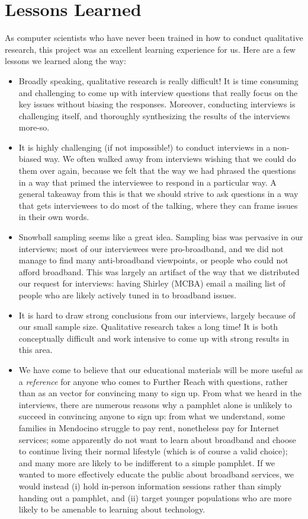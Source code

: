 \section{Lessons Learned}
\label{sec:lessons}

As computer scientists who have never been trained in how to conduct qualitative
research, this project was an excellent learning
experience for us. Here are a few lessons we learned along the way:

\begin{itemize}
\item Broadly speaking, qualitative research is really difficult! It is time
consuming and challenging to come up with interview questions that really
focus on the key issues without biasing the responses. Moreover, conducting
interviews is challenging itself, and thoroughly synthesizing the results of
the interviews more-so.
\item It is highly challenging (if not impossible!) to conduct interviews in a
non-biased way. We often walked away from interviews wishing that we could do
them over again, because we felt that the way we had phrased the questions in
a way that primed the interviewee to respond in a particular way. A general
takeaway from this is that we should strive to ask questions in a way that
gets interviewees to do most of the talking, where they can frame issues in
their own words.
\item Snowball sampling seems like a great idea. Sampling bias was pervasive in our interviews; most of our
interviewees were pro-broadband, and we did not manage to find many
anti-broadband viewpoints,
or people who could not afford broadband. This was largely an artifact of the
way that we distributed our request for interviews: having Shirley (MCBA)
email a mailing list of people who are likely actively tuned in to broadband issues.
\item It is hard to draw strong conclusions from our interviews, largely
because of our small sample size. Qualitative research takes a long time! It is
both conceptually difficult and work intensive to come up with strong results
in this area.
\item We have come to believe that our educational materials will be more
useful as a {\em reference} for anyone who comes to Further Reach with
questions, rather than as an vector for convincing many to sign up. From
what we heard in the interviews, there
are numerous reasons why a pamphlet alone is unlikely to succeed in convincing
anyone to sign up: from what we understand, some families in Mendocino
struggle to pay rent, nonetheless
pay for Internet services; some apparently do not want to learn about broadband
and choose to continue living their normal lifestyle (which is of course a
valid choice);
and many more are likely to be indifferent to a simple pamphlet. If we wanted to more effectively
educate the public about broadband services, we would instead (i) hold
in-person information sessions rather than simply handing out a pamphlet, and
(ii) target younger populations who are more likely to be amenable to learning
about technology.
\end{itemize}


